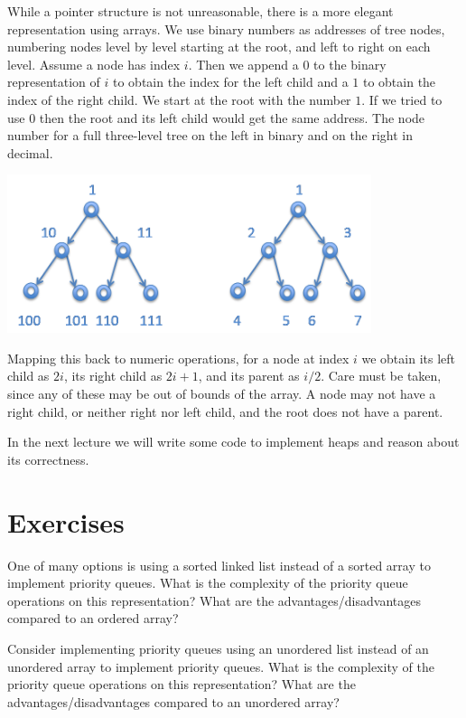 While a pointer structure is not unreasonable, there is a more elegant
representation using arrays.  We use binary numbers as addresses of
tree nodes, numbering nodes level by level starting at the root, and
left to right on each level.  Assume a node has index $i$.  Then we
append a $0$ to the binary representation of $i$ to obtain the index
for the left child and a $1$ to obtain the index of the right child.
We start at the root with the number $1$.  If we tried to use $0$
then the root and its left child would get the same address.  The node
number for a full three-level tree on the left in binary and on the
right in decimal.
\begin{center}
  \includegraphics[width=0.8\textwidth]{img/heapcount.png}
\end{center}
Mapping this back to numeric operations, for a node at index $i$ we
obtain its left child as $2i$, its right child as $2i+1$, and its
parent as $i/2$.  Care must be taken, since any of these may be out of
bounds of the array.  A node may not have a right child, or neither
right nor left child, and the root does not have a parent.

In the next lecture we will write some code to implement heaps
and reason about its correctness.

\clearpage
\section{Exercises}
\label{sec:pq:exercises}

\begin{exercise}
  One of many options is using a sorted linked list instead of a
  sorted array to implement priority queues. What is the complexity of
  the priority queue operations on this representation? What are the
  advantages/disadvantages compared to an ordered array?
\end{exercise}

\begin{exercise}
  Consider implementing priority queues using an unordered list
  instead of an unordered array to implement priority queues. What is
  the complexity of the priority queue operations on this
  representation? What are the advantages/disadvantages compared to an
  unordered array?
\end{exercise}

% 
% 

